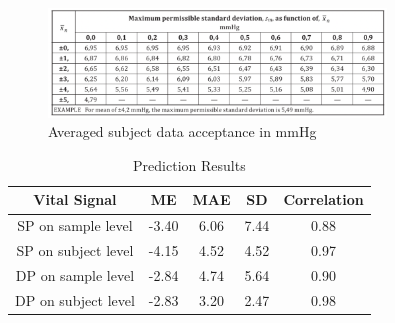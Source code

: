 \documentclass{article}
\begin{document}
\begin{figure}[H]
\centering
\includegraphics[width=0.8\textwidth]{./Fig/ME_STD_Correspond.png}
\caption{Averaged subject data acceptance in mmHg}
\label{ME_STD}
\end{figure}

\begin{table}[h!]
\centering
\begin{tabular}{|c|c|c|c|c|}
\hline
Vital Signal & ME & MAE & SD & Correlation \\ \hline


SP on sample level & -3.40 & 6.06 & 7.44 & 0.88 \\ \hline

SP on subject level & -4.15 & 4.52 & 4.52 & 0.97 \\ \hline

DP on sample level & -2.84 & 4.74 & 5.64 & 0.90 \\ \hline

DP on subject level & -2.83 & 3.20 & 2.47 & 0.98 \\ \hline


\end{tabular}
\caption{Prediction Results}
\label{tab:metrics}
\end{table}
\end{document}
